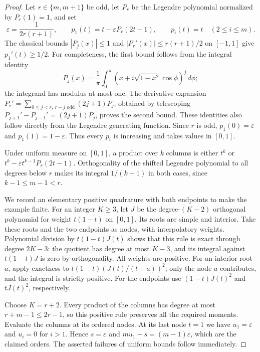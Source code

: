 \documentclass[11pt]{article}
\begin{document}
\begin{proof}
Let $r\in\{m,m+1\}$ be odd, let $P_r$ be the Legendre polynomial
normalized by $P_r(1)=1$, and set
\[
 \varepsilon=\frac1{2r(r+1)},\qquad
 p_1(t)=t-\varepsilon P_r(2t-1),\qquad
 p_i(t)=t\quad(2\le i\le m).
\]
The classical bounds $|P_j(x)|\le1$ and
$|P_r'(x)|\le r(r+1)/2$ on $[-1,1]$ give $p_1'(t)\ge1/2$.
For completeness, the first bound follows from the integral identity
\[
 P_j(x)=\frac1\pi\int_0^\pi
       (x+i\sqrt{1-x^2}\cos\phi)^j\,d\phi;
\]
the integrand has modulus at most one. The derivative expansion
$P_r'=\sum_{0\le j<r,\ r-j\text{ odd}}(2j+1)P_j$, obtained by
telescoping $P_{j+1}'-P_{j-1}'=(2j+1)P_j$, proves the second bound.
These identities also follow directly from the Legendre generating
function. Since $r$ is odd, $p_1(0)=\varepsilon$ and
$p_1(1)=1-\varepsilon$. Thus every $p_i$ is increasing and takes values
in $[0,1]$.

Under uniform measure on $[0,1]$, a product over $k$ columns is either
$t^k$ or $t^k-\varepsilon t^{k-1}P_r(2t-1)$. Orthogonality of the
shifted Legendre polynomial to all degrees below $r$ makes its integral
$1/(k+1)$ in both cases, since $k-1\le m-1<r$.

We record an elementary positive quadrature with both endpoints to
make the example finite. For an integer $K\ge3$, let $J$ be the
degree-$(K-2)$ orthogonal polynomial for weight $t(1-t)$ on $[0,1]$.
Its roots are simple and interior. Take these roots and the two
endpoints as nodes, with interpolatory weights. Polynomial division
by $t(1-t)J(t)$ shows that this rule is exact through degree $2K-3$:
the quotient has degree at most $K-3$, and its integral against
$t(1-t)J$ is zero by orthogonality. All weights are positive. For an
interior root $a$, apply exactness to
$t(1-t)(J(t)/(t-a))^2$; only the node $a$ contributes, and the integral
is strictly positive. For the endpoints use $(1-t)J(t)^2$ and
$tJ(t)^2$, respectively.

Choose $K=r+2$. Every product of the columns has degree at most
$r+m-1\le2r-1$, so this positive rule preserves all the required
moments. Evaluate the columns at its ordered nodes. At its last node
$t=1$ we have $u_1=\varepsilon$ and $u_i=0$ for $i>1$. Hence
$s=\varepsilon$ and $mu_1-s=(m-1)\varepsilon$, which are the claimed
orders. The asserted failures of uniform bounds follow immediately.
\end{proof}
\end{document}
